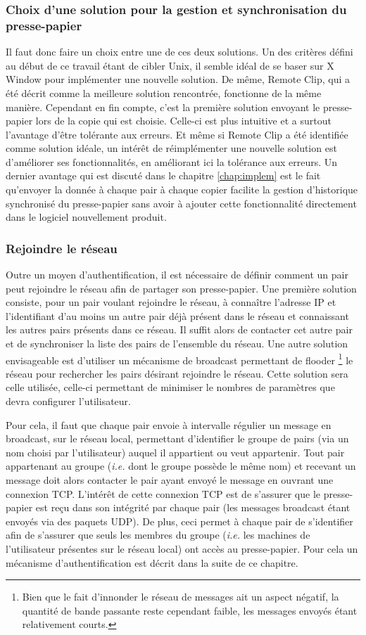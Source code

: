 \subsubsection{Choix d'une solution pour la gestion et
synchronisation du presse-papier}
Il faut donc faire un choix entre une de ces deux solutions. Un des critères
défini au début de ce travail étant de cibler Unix, il semble idéal de se
baser sur X Window pour implémenter une nouvelle solution. De même, Remote
Clip, qui a été décrit comme la meilleure solution rencontrée, fonctionne
de la même manière. Cependant en fin compte, c'est la première solution
envoyant le presse-papier lors de la copie qui est choisie.
Celle-ci est plus intuitive et a surtout l'avantage d'être
tolérante aux erreurs. Et même si Remote Clip a été identifiée comme
solution idéale, un intérêt de réimplémenter une nouvelle solution est
d'améliorer ses fonctionnalités, en améliorant ici la tolérance aux erreurs.
Un dernier avantage qui est discuté dans le chapitre \ref{chap:implem}
est le fait qu'envoyer la donnée à chaque pair à chaque copier facilite
la gestion d'historique synchronisé du presse-papier sans avoir à ajouter
cette fonctionnalité directement dans le logiciel nouvellement produit.

\subsubsection{Rejoindre le réseau}
Outre un moyen d'authentification, il est nécessaire de définir comment
un pair peut rejoindre le réseau afin de partager son presse-papier.
Une première solution consiste, pour un pair voulant
rejoindre le réseau, à connaître l'adresse IP et l'identifiant d'au moins un
autre pair déjà présent dans le réseau et connaissant les autres pairs présents
dans ce réseau. Il suffit alors de contacter cet autre pair et de synchroniser
la  liste des pairs de l'ensemble du réseau. Une autre solution envisageable
est d'utiliser un mécanisme de broadcast permettant de flooder
\footnote{Bien que le fait d'innonder le réseau de messages ait un aspect
négatif, la quantité de bande passante reste cependant faible, les messages
envoyés étant relativement courts.} le réseau pour
rechercher les pairs désirant rejoindre le réseau. Cette solution sera celle
utilisée, celle-ci permettant de minimiser le nombres de paramètres que devra
configurer l'utilisateur.

Pour cela, il faut que chaque pair envoie à intervalle régulier un message
en broadcast, sur le réseau local, permettant d'identifier le groupe de pairs
(via un nom choisi par l'utilisateur)
auquel il appartient ou veut appartenir. Tout pair appartenant au groupe
(\emph{i.e.} dont le groupe possède le même nom) et
recevant un message doit alors contacter le pair ayant envoyé le message en
ouvrant une connexion TCP. L'intérêt de cette connexion TCP est de s'assurer
que le presse-papier est reçu dans son intégrité par chaque pair (les
messages broadcast étant envoyés via des paquets UDP). De plus,
ceci permet à chaque pair de s'identifier afin de s'assurer que seuls
les membres du groupe (\emph{i.e.} les machines de l'utilisateur présentes
sur le réseau local) ont accès au presse-papier. Pour cela un
mécanisme d'authentification est décrit dans la suite de ce chapitre.

